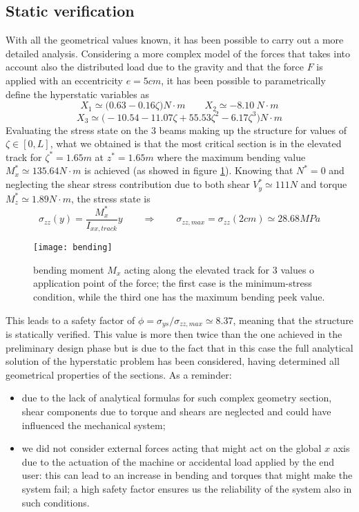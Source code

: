 \subsection{Static verification}
	With all the geometrical values known, it has been possible to carry out a more detailed analysis. Considering a more complex model of the forces that takes into account also the distributed load due to the gravity and that the force $F$ is applied with an eccentricity $e=5cm$, it has been possible to parametrically define the hyperstatic variables as
	\[ X_1 \simeq \big( 0.63-0.16\zeta\big) N\cdot m \qquad X_2 \simeq -8.10 \ N\cdot m \] \[ X_3 \simeq \big( - 10.54 - 11.07\zeta + 55.53\zeta^2 - 6.17\zeta^3 \big) N\cdot m \]
	Evaluating the stress state on the 3 beams making up the structure for values of $\zeta \in [0,L]$, what we obtained is that the most critical section is in the elevated track for $\zeta^* = 1.65m$ at $z^* = 1.65m$ where the maximum bending value $M_x^* \simeq 135.64N\cdot m$ is achieved (as showed in figure \ref{fig:bending}). Knowing that $N^* = 0$ and neglecting the shear stress contribution due to both shear $V_y^* \simeq 111N$ and torque $M_z^* \simeq 1.89N\cdot m$, the stress state is
	\[ \sigma_{zz}(y) = \frac{M_x^*}{I_{xx,track}}y \qquad \Rightarrow \qquad \sigma_{zz,max} = \sigma_{zz}(2cm) \simeq 28.68 MPa   \]
	\begin{figure}[b]
		\centering \texttt{[image: bending]}
		\caption{bending moment $M_x$ acting along the elevated track for 3 values o application point of the force; the first case is the minimum-stress condition, while the third one has the maximum bending peek value.} \label{fig:bending}
	\end{figure}
	This leads to a safety factor of $\phi = \sigma_{ys}/\sigma_{zz,max} \simeq 8.37$, meaning that the structure is statically verified. This value is more then twice than the one achieved in the preliminary design phase but is due to the fact that in this case the full analytical solution of the hyperstatic problem has been considered, having determined all geometrical properties of the sections. As a reminder:
	\begin{itemize}
		\item due to the lack of analytical formulas for such complex geometry section, shear components due to torque and shears are neglected and could have influenced the mechanical system;
		\item we did not consider external forces acting that might act on the global $x$ axis due to the actuation of the machine or accidental load applied by the end user: this can lead to an increase in bending and torques that might make the system fail; a high safety factor ensures us the reliability of the system also in such conditions.
	\end{itemize}
	
